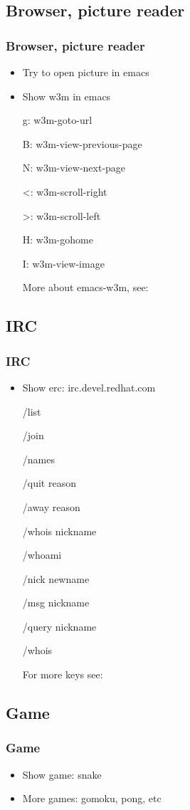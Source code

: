 \subsection{Browser, picture reader}
\begin{frame}
\frametitle{Browser, picture reader}
    \begin{itemize}
        \item Try to open picture in emacs
        \item Show w3m in emacs

  g: w3m-goto-url

  B: w3m-view-previous-page

  N: w3m-view-next-page

  <: w3m-scroll-right

  >: w3m-scroll-left

  H: w3m-gohome

  I: w3m-view-image

  More about emacs-w3m, see: \href{http://kongll.github.io/2014/10/30/Emacs-w3m-\%E6\%93\%8D\%E4\%BD\%9C\%E5\%BF\%AB\%E6\%8D\%B7\%E9\%94\%AE/}{}
    \end{itemize}
\end{frame}
\subsection{IRC}
\begin{frame}
\frametitle{IRC}
    \begin{itemize}
        \item Show erc: irc.devel.redhat.com

  /list

  /join

  /names

  /quit reason

  /away reason

  /whois nickname

  /whoami

  /nick newname

  /msg nickname

  /query nickname

  /whois

  For more keys see: \href{http://kongll.github.io/2014/11/05/IRC-ERC-commands}{}

    \end{itemize}
\end{frame}
\subsection{Game}
\begin{frame}
\frametitle{Game}
    \begin{itemize}
        \item Show game: snake
        \item More games: gomoku, pong, etc
    \end{itemize}
\end{frame}
